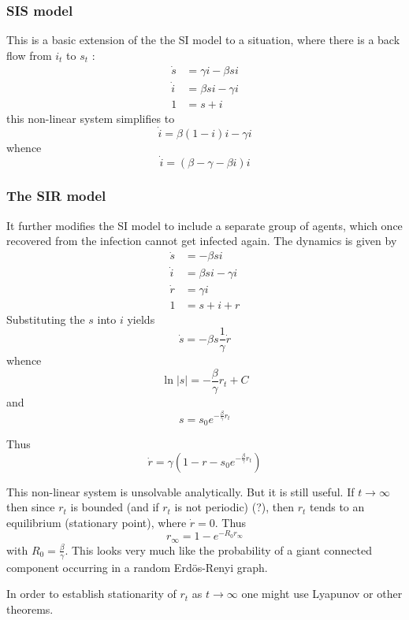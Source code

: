 \documentclass[a4paper]{article}
\begin{document}

\subsubsection{SIS model} %
\label{ssub:sis_model}

This is a basic extension of the the SI model to a situation, where there is a
back flow from $i_t$ to $s_t$ :
\begin{align*}
	\dot{s} &= \gamma i - \beta s i\\
	\dot{i} &= \beta s i - \gamma i\\
	1 &= s+i
\end{align*}
this non-linear system simplifies to
\[\dot{i} = \beta (1-i) i - \gamma i\]
whence
\[\dot{i} = (\beta - \gamma - \beta i ) i \]


\subsubsection{The SIR model} %
\label{ssub:the_sir_model}

It further modifies the SI model to include a separate group of agents, which
once recovered from the infection cannot get infected again. The dynamics is
given by
\begin{align*}
	\dot{s} &= - \beta s i\\
	\dot{i} &= \beta s i - \gamma i\\
	\dot{r} &= \gamma i\\
	1 &= s+i+r
\end{align*}
Substituting the $s$ into $i$ yields
\[\dot{s} = - \beta s \frac{1}{\gamma}\dot{r}\]
whence
\[\ln|s| = -\frac{\beta}{\gamma} r_t + C \]
and 
\[ s = s_0 e^{-\frac{\beta}{\gamma} r_t}\]

Thus
\[\dot{r} = \gamma (1 - r - s_0 e^{-\frac{\beta}{\gamma} r_t})\]

This non-linear system is unsolvable analytically. But it is still useful. If 
$t\to \infty$ then since $r_t$ is bounded (and if $r_t$ is not periodic) (?),
then $r_t$ tends to an equilibrium (stationary point), where $\dot{r} = 0$.
Thus
\[r_\infty = 1 - e^{-R_0 r_\infty}\]
with $R_0 = \frac{\beta}{\gamma}$. This looks very much like the probability
of a giant connected component occurring in a random Erd\"os-Renyi graph.

In order to establish stationarity of $r_t$ as $t\to\infty$ one might use
Lyapunov or other theorems.
\end{document}
